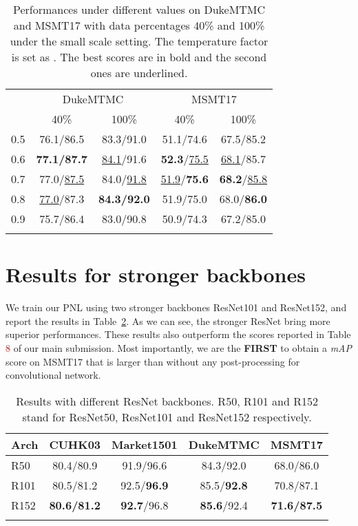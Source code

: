 \documentclass[10pt,twocolumn,letterpaper]{article}
\begin{document}
\begin{table}[t]
	\setlength{\tabcolsep}{2.6mm}
	\begin{tabular}{l|c|c|c|c}
		\shline
		\multirow{2}{*}{} & \multicolumn{2}{c|}{DukeMTMC} & \multicolumn{2}{c}{MSMT17} \\ 
		\cline{2-5} & 40\% & 100\% & 40\% & 100\% \\ 
		\hline 
		0.5 & 76.1/86.5 & 83.3/91.0 & 51.1/74.6 & 67.5/85.2 \\
		0.6 & \textbf{77.1/87.7} & \underline{84.1}/91.6 & \textbf{52.3}/\underline{75.5} & \underline{68.1}/85.7 \\
		0.7 & 77.0/\underline{87.5} & 84.0/\underline{91.8} & \underline{51.9}/\textbf{75.6} & \textbf{68.2}/\underline{85.8} \\
		0.8 & \underline{77.0}/87.3 & \textbf{84.3/92.0} & 51.9/75.0 & 68.0/\textbf{86.0} \\
		0.9 & 75.7/86.4 & 83.0/90.8 & 50.9/74.3 & 67.2/85.0 \\
		\shline
	\end{tabular}
	\caption{Performances under different  values on DukeMTMC and MSMT17 with data percentages 40\% and 100\% under the small scale setting. The temperature factor is set as . The best scores are in bold and  the second ones are underlined.}
	\label{tab:th}
\end{table}

\section{Results for stronger backbones}
We train our PNL using two stronger backbones ResNet101 and ResNet152, and report the results in Table~\ref{tab:r101}. As we can see, the stronger ResNet bring more superior performances. These results also outperform the scores reported in Table \textcolor{red}{8} of our main submission. Most importantly, we are the \textbf{FIRST} to obtain a \emph{mAP} score on MSMT17 that is larger than  without any post-processing for convolutional network.

\begin{table}[t]
	\setlength{\tabcolsep}{1.2mm}
	\centering
	\begin{tabular}{l|c|c|c|c}
		\shline
		Arch & CUHK03 & Market1501 & DukeMTMC & MSMT17 \\
		\hline
		R50  & 80.4/80.9 & 91.9/96.6 & 84.3/92.0 & 68.0/86.0 \\
		R101 & 80.5/81.2 & 92.5/\textbf{96.9} & 85.5/\textbf{92.8} & 70.8/87.1 \\
		R152 & \textbf{80.6/81.2} & \textbf{92.7}/96.8 & \textbf{85.6}/92.4 & \textbf{71.6/87.5} \\
		\shline
	\end{tabular}
	\caption{Results with different ResNet backbones. R50, R101 and R152 stand for ResNet50, ResNet101 and ResNet152 respectively.}
\label{tab:r101}
\end{table}
\end{document}
